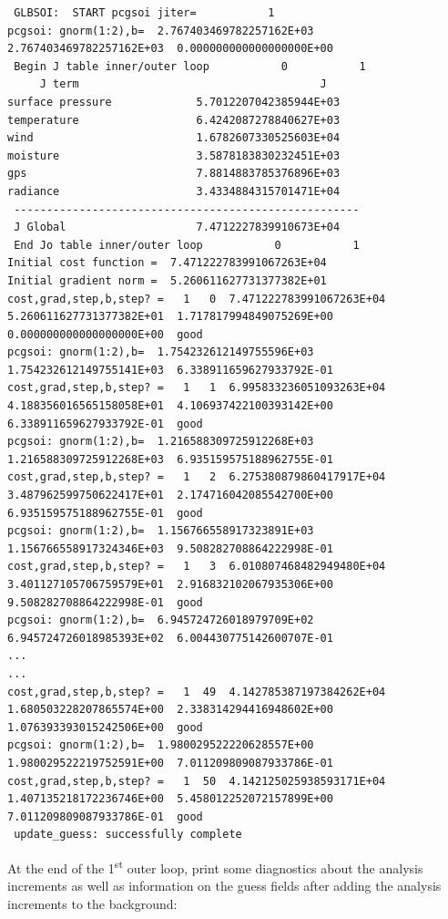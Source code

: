 \begin{tiny}
\begin{verbatim}
 GLBSOI:  START pcgsoi jiter=           1
pcgsoi: gnorm(1:2),b=  2.767403469782257162E+03  2.767403469782257162E+03  0.000000000000000000E+00
 Begin J table inner/outer loop           0           1
     J term                                     J
surface pressure             5.7012207042385944E+03
temperature                  6.4242087278840627E+03
wind                         1.6782607330525603E+04
moisture                     3.5878183830232451E+03
gps                          7.8814883785376896E+03
radiance                     3.4334884315701471E+04
 -----------------------------------------------------
 J Global                    7.4712227839910673E+04
 End Jo table inner/outer loop           0           1
Initial cost function =  7.471222783991067263E+04
Initial gradient norm =  5.260611627731377382E+01
cost,grad,step,b,step? =   1   0  7.471222783991067263E+04  5.260611627731377382E+01  1.717817994849075269E+00  0.000000000000000000E+00  good
pcgsoi: gnorm(1:2),b=  1.754232612149755596E+03  1.754232612149755141E+03  6.338911659627933792E-01
cost,grad,step,b,step? =   1   1  6.995833236051093263E+04  4.188356016565158058E+01  4.106937422100393142E+00  6.338911659627933792E-01  good
pcgsoi: gnorm(1:2),b=  1.216588309725912268E+03  1.216588309725912268E+03  6.935159575188962755E-01
cost,grad,step,b,step? =   1   2  6.275380879860417917E+04  3.487962599750622417E+01  2.174716042085542700E+00  6.935159575188962755E-01  good
pcgsoi: gnorm(1:2),b=  1.156766558917323891E+03  1.156766558917324346E+03  9.508282708864222998E-01
cost,grad,step,b,step? =   1   3  6.010807468482949480E+04  3.401127105706759579E+01  2.916832102067935306E+00  9.508282708864222998E-01  good
pcgsoi: gnorm(1:2),b=  6.945724726018979709E+02  6.945724726018985393E+02  6.004430775142600707E-01
...
...
cost,grad,step,b,step? =   1  49  4.142785387197384262E+04  1.680503228207865574E+00  2.338314294416948602E+00  1.076393393015242506E+00  good
pcgsoi: gnorm(1:2),b=  1.980029522220628557E+00  1.980029522219752591E+00  7.011209809087933786E-01
cost,grad,step,b,step? =   1  50  4.142125025938593171E+04  1.407135218172236746E+00  5.458012252072157899E+00  7.011209809087933786E-01  good
 update_guess: successfully complete
\end{verbatim}
\end{tiny}
At the end of the 1\textsuperscript{st} outer loop, print some diagnostics about the analysis increments as well as information on the guess fields after adding the analysis increments to the background: 
